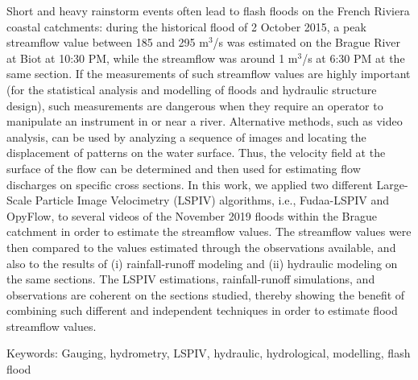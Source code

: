 Short and heavy rainstorm events often lead to flash floods on the French Riviera coastal catchments: during the historical flood of 2 October 2015, a peak streamflow value between 185 and 295 m$^3$/s was estimated on the Brague River at Biot at 10:30 PM, while the streamflow was around 1 m$^3$/s at 6:30 PM at the same section. If the measurements of such streamflow values are highly important (for the statistical analysis and modelling of floods and hydraulic structure design), such measurements are dangerous when they require an operator to manipulate an instrument in or near a river. Alternative methods, such as video analysis, can be used by analyzing a sequence of images and locating the displacement of patterns on the water surface. Thus, the velocity field at the surface of the flow can be determined and then used for estimating flow discharges on specific cross sections.  In this work, we applied two different Large-Scale Particle Image Velocimetry (LSPIV) algorithms, i.e., Fudaa-LSPIV and OpyFlow, to several videos of the November 2019 floods within the Brague catchment in order to estimate the streamflow values. The streamflow values were then compared to the values estimated through the observations available, and also to the results of (i) rainfall-runoff modeling and (ii) hydraulic modeling on the same sections. The LSPIV estimations, rainfall-runoff simulations, and observations are coherent on the sections studied, thereby showing the benefit of combining such different and independent techniques in order to estimate flood streamflow values.

Keywords: Gauging, hydrometry, LSPIV, hydraulic, hydrological, modelling, flash flood

\newpage{}
{}
\begin{flushleft}






\end{flushleft}

